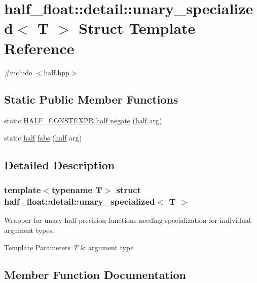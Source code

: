 \hypertarget{structhalf__float_1_1detail_1_1unary__specialized}{}\section{half\+\_\+float\+:\+:detail\+:\+:unary\+\_\+specialized$<$ T $>$ Struct Template Reference}
\label{structhalf__float_1_1detail_1_1unary__specialized}


{\ttfamily \#include $<$half.\+hpp$>$}

\subsection*{Static Public Member Functions}
\begin{DoxyCompactItemize}
\item 
static \hyperlink{half_8hpp_ace3116a3e2cd66dd15780b92060987c7}{H\+A\+L\+F\+\_\+\+C\+O\+N\+S\+T\+E\+X\+PR} \hyperlink{classhalf__float_1_1half}{half} \hyperlink{structhalf__float_1_1detail_1_1unary__specialized_a6b8b9de170c31ccbcc6ef56ed9c488a1}{negate} (\hyperlink{classhalf__float_1_1half}{half} arg)
\item 
static \hyperlink{classhalf__float_1_1half}{half} \hyperlink{structhalf__float_1_1detail_1_1unary__specialized_a9f98cb43656e90319b63016c7dbadfc0}{fabs} (\hyperlink{classhalf__float_1_1half}{half} arg)
\end{DoxyCompactItemize}


\subsection{Detailed Description}
\subsubsection*{template$<$typename T$>$\newline
struct half\+\_\+float\+::detail\+::unary\+\_\+specialized$<$ T $>$}

Wrapper for unary half-\/precision functions needing specialization for individual argument types. 
\begin{DoxyTemplParams}{Template Parameters}
{\em T} & argument type \\
\hline
\end{DoxyTemplParams}


\subsection{Member Function Documentation}
\mbox{\label{structhalf__float_1_1detail_1_1unary__specialized_a9f98cb43656e90319b63016c7dbadfc0}} 
